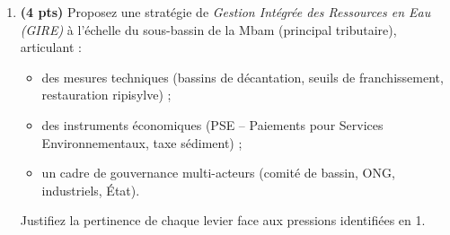 \documentclass[11pt]{article}
\begin{document}
\begin{exercice}
\begin{enumerate}
    \item \textbf{(4 pts)} Proposez une stratégie de \textit{Gestion Intégrée des Ressources en Eau (GIRE)} à l'échelle du sous-bassin de la Mbam (principal tributaire), articulant : 
    \begin{itemize}
        \item des mesures techniques (bassins de décantation, seuils de franchissement, restauration ripisylve) ;
        \item des instruments économiques (PSE -- Paiements pour Services Environnementaux, taxe sédiment) ;
        \item un cadre de gouvernance multi-acteurs (comité de bassin, ONG, industriels, État).
    \end{itemize}
    Justifiez la pertinence de chaque levier face aux pressions identifiées en 1.
\end{enumerate}
\end{exercice}
\end{document}

